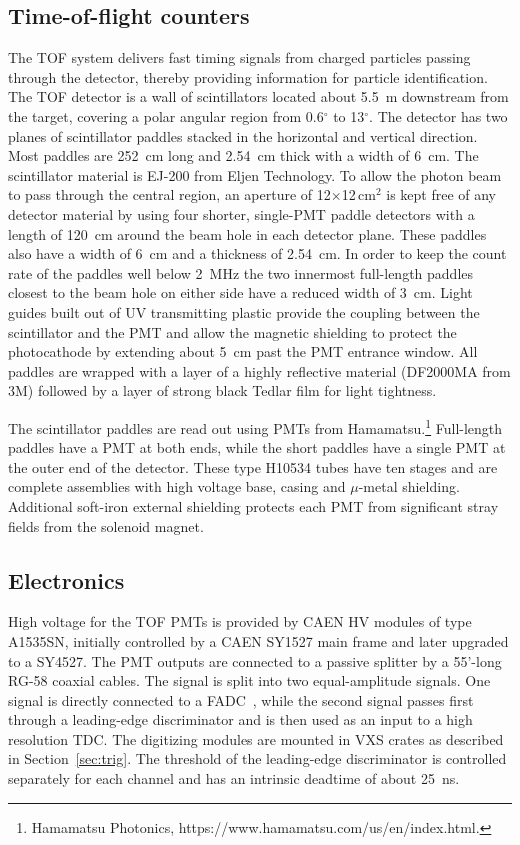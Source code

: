 \subsection[Time-of-Flight counters]{Time-of-flight counters \label{sec:tof}}
The TOF system delivers fast timing signals from charged particles passing through the detector, thereby providing information for particle identification.
The TOF detector is a wall of scintillators located about 5.5~m downstream from the target, covering 
a polar angular region from 0.6$^{\circ}$ to 13$^{\circ}$. The detector has two planes of
scintillator paddles stacked in the horizontal and vertical direction. Most paddles are 252~cm long and 2.54~cm
thick with a width of 6~cm. 
The scintillator material is EJ-200 from Eljen Technology.
To allow the photon beam to pass through the central region,
an aperture of 12$\times$12\,cm$^2$ is kept
free of any detector material by using four shorter, single-PMT paddle detectors with a length of 120~cm around the beam hole
in each detector plane. These paddles also have a width of 6~cm and a thickness of 2.54~cm. In order to keep the
count rate of the paddles well below 2~MHz the two innermost full-length paddles closest to the beam hole on either side have a reduced width of 3~cm.
Light guides built out of UV transmitting plastic provide the coupling between the scintillator and the PMT and allow the 
magnetic shielding to protect the photocathode by extending about 5~cm past the PMT entrance window. All paddles are wrapped
with a layer of a highly reflective material (DF2000MA from 3M) followed by a layer of strong black Tedlar film for light tightness. 

The scintillator paddles are read out using 
PMTs from Hamamatsu.\footnote{Hamamatsu Photonics, https://www.hamamatsu.com/us/en/index.html.} Full-length paddles
have a PMT at both ends, while the short paddles have a single PMT
at the outer end of the detector. These type H10534 tubes have ten stages and are complete assemblies with high voltage base, casing and $\mu$-metal shielding. Additional soft-iron external shielding protects each PMT from significant stray fields from the solenoid magnet.


\subsection{Electronics \label{sec:scelectronics}}
High voltage for the TOF PMTs is provided by CAEN HV modules of type A1535SN, initially controlled by a CAEN SY1527 main frame and
later upgraded to a SY4527.
The PMT outputs are connected to a passive splitter by a 55'-long RG-58 coaxial cables. The signal is split into two equal-amplitude signals. One signal is directly connected to a FADC~\cite{Dong:2007}, while the second signal passes first through a leading-edge discriminator and is then used as an input to a high resolution TDC. The digitizing modules are mounted in VXS crates as described in Section~\ref{sec:trig}.
The threshold of the leading-edge discriminator is controlled separately for each channel and has an intrinsic
deadtime of about 25~ns.

